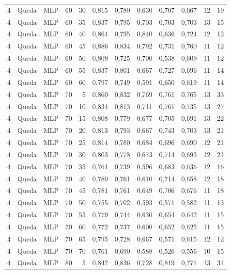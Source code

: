 \begin{longtable}{ccclrrrrrrrr}
4 & Queda & MLP & 60 & 30 & 0,815 & 0,780 & 0,630 & 0,707 & 0,667 & 12 & 19 \\
4 & Queda & MLP & 60 & 35 & 0,837 & 0,795 & 0,703 & 0,703 & 0,703 & 13 & 15 \\
4 & Queda & MLP & 60 & 40 & 0,864 & 0,795 & 0,840 & 0,636 & 0,724 & 12 & 12 \\
4 & Queda & MLP & 60 & 45 & 0,886 & 0,834 & 0,792 & 0,731 & 0,760 & 11 & 12 \\
4 & Queda & MLP & 60 & 50 & 0,809 & 0,725 & 0,700 & 0,538 & 0,609 & 11 & 12 \\
4 & Queda & MLP & 60 & 55 & 0,837 & 0,801 & 0,667 & 0,727 & 0,696 & 11 & 14 \\
4 & Queda & MLP & 60 & 60 & 0,797 & 0,749 & 0,591 & 0,650 & 0,619 & 11 & 14 \\
4 & Queda & MLP & 70 & 5 & 0,860 & 0,832 & 0,769 & 0,761 & 0,765 & 13 & 33 \\
4 & Queda & MLP & 70 & 10 & 0,834 & 0,813 & 0,711 & 0,761 & 0,735 & 13 & 27 \\
4 & Queda & MLP & 70 & 15 & 0,808 & 0,779 & 0,677 & 0,705 & 0,691 & 13 & 22 \\
4 & Queda & MLP & 70 & 20 & 0,813 & 0,793 & 0,667 & 0,743 & 0,703 & 13 & 21 \\
4 & Queda & MLP & 70 & 25 & 0,814 & 0,780 & 0,684 & 0,696 & 0,690 & 12 & 21 \\
4 & Queda & MLP & 70 & 30 & 0,803 & 0,778 & 0,673 & 0,714 & 0,693 & 12 & 21 \\
4 & Queda & MLP & 70 & 35 & 0,761 & 0,739 & 0,596 & 0,683 & 0,636 & 12 & 16 \\
4 & Queda & MLP & 70 & 40 & 0,780 & 0,761 & 0,610 & 0,714 & 0,658 & 12 & 18 \\
4 & Queda & MLP & 70 & 45 & 0,781 & 0,761 & 0,649 & 0,706 & 0,676 & 11 & 18 \\
4 & Queda & MLP & 70 & 50 & 0,755 & 0,702 & 0,593 & 0,571 & 0,582 & 11 & 13 \\
4 & Queda & MLP & 70 & 55 & 0,779 & 0,744 & 0,630 & 0,654 & 0,642 & 11 & 15 \\
4 & Queda & MLP & 70 & 60 & 0,772 & 0,737 & 0,600 & 0,652 & 0,625 & 11 & 15 \\
4 & Queda & MLP & 70 & 65 & 0,795 & 0,728 & 0,667 & 0,571 & 0,615 & 12 & 12 \\
4 & Queda & MLP & 70 & 70 & 0,761 & 0,690 & 0,588 & 0,526 & 0,556 & 10 & 15 \\
4 & Queda & MLP & 80 & 5 & 0,842 & 0,836 & 0,728 & 0,819 & 0,771 & 13 & 31 \\

\end{longtable}
